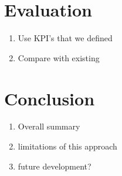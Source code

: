 \section{Evaluation}
\begin{enumerate}
	\item Use KPI's that we defined
	\item Compare with existing
\end{enumerate}

\section{Conclusion}
\begin{enumerate}
	\item Overall summary
	\item limitations of this approach
	\item future development?
\end{enumerate}

